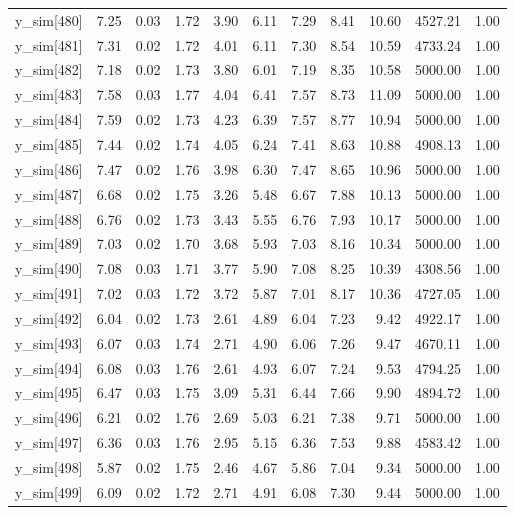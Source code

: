 \begin{table}[ht]
\begin{tabular}{rrrrrrrrrrr}
  y\_sim[480] & 7.25 & 0.03 & 1.72 & 3.90 & 6.11 & 7.29 & 8.41 & 10.60 & 4527.21 & 1.00 \\ 
  y\_sim[481] & 7.31 & 0.02 & 1.72 & 4.01 & 6.11 & 7.30 & 8.54 & 10.59 & 4733.24 & 1.00 \\ 
  y\_sim[482] & 7.18 & 0.02 & 1.73 & 3.80 & 6.01 & 7.19 & 8.35 & 10.58 & 5000.00 & 1.00 \\ 
  y\_sim[483] & 7.58 & 0.03 & 1.77 & 4.04 & 6.41 & 7.57 & 8.73 & 11.09 & 5000.00 & 1.00 \\ 
  y\_sim[484] & 7.59 & 0.02 & 1.73 & 4.23 & 6.39 & 7.57 & 8.77 & 10.94 & 5000.00 & 1.00 \\ 
  y\_sim[485] & 7.44 & 0.02 & 1.74 & 4.05 & 6.24 & 7.41 & 8.63 & 10.88 & 4908.13 & 1.00 \\ 
  y\_sim[486] & 7.47 & 0.02 & 1.76 & 3.98 & 6.30 & 7.47 & 8.65 & 10.96 & 5000.00 & 1.00 \\ 
  y\_sim[487] & 6.68 & 0.02 & 1.75 & 3.26 & 5.48 & 6.67 & 7.88 & 10.13 & 5000.00 & 1.00 \\ 
  y\_sim[488] & 6.76 & 0.02 & 1.73 & 3.43 & 5.55 & 6.76 & 7.93 & 10.17 & 5000.00 & 1.00 \\ 
  y\_sim[489] & 7.03 & 0.02 & 1.70 & 3.68 & 5.93 & 7.03 & 8.16 & 10.34 & 5000.00 & 1.00 \\ 
  y\_sim[490] & 7.08 & 0.03 & 1.71 & 3.77 & 5.90 & 7.08 & 8.25 & 10.39 & 4308.56 & 1.00 \\ 
  y\_sim[491] & 7.02 & 0.03 & 1.72 & 3.72 & 5.87 & 7.01 & 8.17 & 10.36 & 4727.05 & 1.00 \\ 
  y\_sim[492] & 6.04 & 0.02 & 1.73 & 2.61 & 4.89 & 6.04 & 7.23 & 9.42 & 4922.17 & 1.00 \\ 
  y\_sim[493] & 6.07 & 0.03 & 1.74 & 2.71 & 4.90 & 6.06 & 7.26 & 9.47 & 4670.11 & 1.00 \\ 
  y\_sim[494] & 6.08 & 0.03 & 1.76 & 2.61 & 4.93 & 6.07 & 7.24 & 9.53 & 4794.25 & 1.00 \\ 
  y\_sim[495] & 6.47 & 0.03 & 1.75 & 3.09 & 5.31 & 6.44 & 7.66 & 9.90 & 4894.72 & 1.00 \\ 
  y\_sim[496] & 6.21 & 0.02 & 1.76 & 2.69 & 5.03 & 6.21 & 7.38 & 9.71 & 5000.00 & 1.00 \\ 
  y\_sim[497] & 6.36 & 0.03 & 1.76 & 2.95 & 5.15 & 6.36 & 7.53 & 9.88 & 4583.42 & 1.00 \\ 
  y\_sim[498] & 5.87 & 0.02 & 1.75 & 2.46 & 4.67 & 5.86 & 7.04 & 9.34 & 5000.00 & 1.00 \\ 
  y\_sim[499] & 6.09 & 0.02 & 1.72 & 2.71 & 4.91 & 6.08 & 7.30 & 9.44 & 5000.00 & 1.00 \\ 

\end{tabular}
\end{table}

